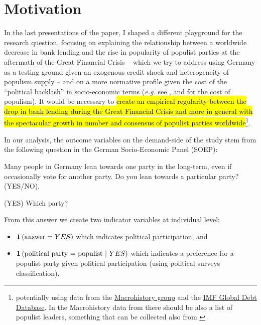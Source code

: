 \documentclass[11pt]{article}
\begin{document}

\section{Motivation}\label{sec:motivation}

In the last presentations of the paper, I shaped a different playground for the research question, focusing on explaining the relationship between a worldwide decrease in bank lending and the rise in popularity of populist parties at the aftermath of the Great Financial Crisis \citep[similar to][]{bib:funke2016} -- which we try to address using Germany as a testing ground given an exogenous credit shock and heterogeneity of populism supply -- and on a more normative profile given the cost of the ``political backlash'' in socio-economic terms (\textit{e.g.} see \citet{bib:funke2020}, \citet{bib:romarri2020} and \citet{bib:bursztyn2020a} for the cost of populism).
It would be necessary to \hl{create an empirical regularity between the drop in bank lending during the Great Financial Crisis and more in general with the spectacular growth in number and consensus of populist parties worldwide}\footnote{potentially using data from the \href{https://www.macrohistory.net/database/}{Macrohistory group} and the \href{https://www.imf.org/external/datamapper/datasets/GDD}{IMF Global Debt Database}. In the Macrohistory data from \citep{bib:funke2020} there should be also a list of populist leaders, something that can be collected also from \cite{bib:guiso2020}}.

In our analysis, the outcome variables on the demand-side of the study stem from the following question in the German Socio-Economic Panel (SOEP):

\begin{displayquote}
Many people in Germany lean towards one party in the long-term, even if occasionally vote for another party. Do you lean towards a particular party? (YES/NO).

(YES) Which party?
\end{displayquote}

From this answer we create two indicator variables at individual level:

\begin{itemize}
    \item $\mathbf{1}\left( \text{answer} = YES \right)$ which indicates political participation, and
    \item $\mathbf{1}\left( \text{political party = populist}\ |\ YES \right)$ which indicates a preference for a populist party given political participation (using political surveys classification).
\end{itemize}
\end{document}
